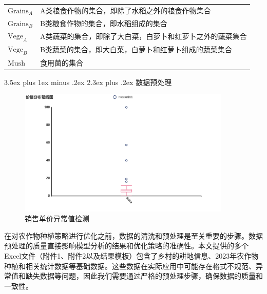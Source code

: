 \documentclass[12pt,a4paper]{nmmcm}
\makeatletter
\renewcommand\section{\@startsection{section}{1}{0pt}%
    {3.5ex plus 1ex minus .2ex}%
    {2.3ex plus .2ex}%
    {\normalfont\LARGE\bfseries}}
\makeatother
\begin{document}
\begin{table}[htbp]
\begin{tabular}{p{3cm} | p{10cm}}
    $\text{Grains}_A$ & A类粮食作物的集合，即除了水稻之外的粮食作物集合                                                                           \\
    $\text{Grains}_B$ & B类粮食作物的集合，即水稻组成的集合                                                                             \\
    $\text{Vege}_A$   & A类蔬菜的集合，即除了大白菜，白萝卜和红萝卜之外的蔬菜集合                                                                            \\
    $\text{Vege}_B$   & B类蔬菜的集合，即大白菜，白萝卜和红萝卜组成的蔬菜集合                                                  \\
    $\text{Mush}$     & 食用菌的集合                                                                                \\
    \hline
    \hline
  \end{tabular}
\end{table}


\section{数据预处理}
\begin{figure}[H]
  \centering
  \includegraphics[width=0.9\textwidth]{figures/preprocess/preprocess1.png}
  \caption{销售单价异常值检测}
  \label{fig:preprocess1}
\end{figure}


在对农作物种植策略进行优化之前，数据的清洗和预处理是至关重要的步骤。数据预处理的质量直接影响模型分析的结果和优化策略的准确性。本文提供的多个Excel文件（附件1、附件2以及结果模板）包含了乡村的耕地信息、2023年农作物种植和相关统计数据等基础数据。这些数据在实际应用中可能存在格式不规范、异常值和缺失数据等问题，因此我们需要通过严格的预处理步骤，确保数据的质量和一致性。
\end{document}
